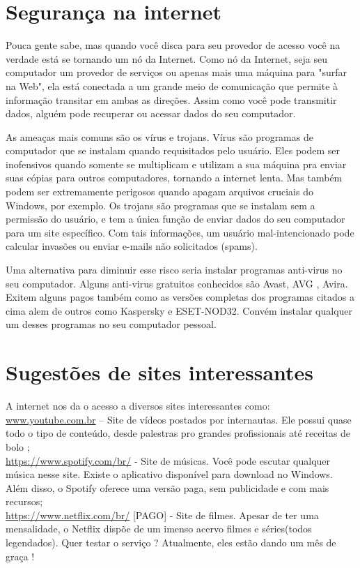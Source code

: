 \documentclass[hidelinks,12pt]{article}
\begin{document}
	\section{Segurança na internet}
	
	Pouca gente sabe, mas quando você disca para seu provedor de acesso você na verdade está se tornando um nó da Internet. Como nó da Internet, seja seu computador um provedor de serviços ou apenas mais uma máquina para "surfar na Web", ela está conectada a um grande meio de comunicação que permite à informação transitar em ambas as direções. Assim como você pode transmitir dados, alguém pode recuperar ou acessar dados do seu computador. 

	As ameaças mais comuns são os vírus e trojans. Vírus são programas de computador que se instalam quando requisitados pelo usuário. Eles podem ser inofensivos quando somente se multiplicam e utilizam a sua máquina pra enviar suas cópias para outros computadores, tornando a internet lenta. Mas também podem ser extremamente perigosos quando apagam arquivos cruciais do Windows, por exemplo. Os trojans são programas que se instalam sem a permissão do usuário, e tem a única função de enviar dados do seu computador para um site específico. Com tais informações, um usuário mal-intencionado pode calcular invasões ou enviar e-mails não solicitados (spams).
	
	Uma alternativa para diminuir esse risco seria instalar programas anti-virus no seu computador. Alguns anti-virus gratuitos conhecidos são Avast, AVG , Avira. Exitem alguns pagos também como as versões completas dos programas citados a cima alem de outros como Kaspersky e ESET-NOD32. Convém instalar qualquer um desses programas no seu computador pessoal.
	
	
	\section{Sugestões de sites interessantes}
		A internet nos da o acesso a diversos sites interessantes como:\\

		\url{www.youtube.com.br} – Site de vídeos postados por internautas. Ele possui quase todo o tipo de conteúdo, desde palestras pro grandes profissionais até receitas de bolo ;\\

		\url{https://www.spotify.com/br/} - Site de músicas. Você pode escutar qualquer música nesse site. Existe o aplicativo disponível para download no Windows. Além disso, o Spotify oferece uma versão paga, sem publicidade e com mais recursos;\\
		
		\url{https://www.netflix.com/br/} [PAGO] - Site de filmes. Apesar de ter uma mensalidade, o Netflix dispõe de um imenso acervo filmes e séries(todos legendados). Quer testar o serviço ? Atualmente, eles estão dando um mês de graça !
\end{document}
